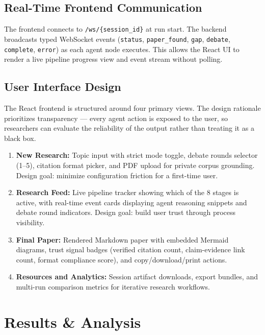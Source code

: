 \documentclass[12pt, a4paper]{article}
\begin{document}
\subsection{Real-Time Frontend Communication}
The frontend connects to \texttt{/ws/\{session\_id\}} at run start. The backend broadcasts
typed WebSocket events (\texttt{status}, \texttt{paper\_found}, \texttt{gap},
\texttt{debate}, \texttt{complete}, \texttt{error}) as each agent node executes. This allows
the React UI to render a live pipeline progress view and event stream without polling.

\subsection{User Interface Design}
The React frontend is structured around four primary views. The design rationale prioritizes
transparency --- every agent action is exposed to the user, so researchers can evaluate the
reliability of the output rather than treating it as a black box.

\begin{enumerate}[leftmargin=*, itemsep=3pt]
    \item \textbf{New Research:} Topic input with strict mode toggle, debate rounds selector
          (1--5), citation format picker, and PDF upload for private corpus grounding.
          Design goal: minimize configuration friction for a first-time user.
    \item \textbf{Research Feed:} Live pipeline tracker showing which of the 8 stages is
          active, with real-time event cards displaying agent reasoning snippets and debate
          round indicators. Design goal: build user trust through process visibility.
    \item \textbf{Final Paper:} Rendered Markdown paper with embedded Mermaid diagrams,
          trust signal badges (verified citation count, claim-evidence link count, format
          compliance score), and copy/download/print actions.
    \item \textbf{Resources and Analytics:} Session artifact downloads, export bundles,
          and multi-run comparison metrics for iterative research workflows.
\end{enumerate}

\section{Results \& Analysis}
\end{document}
